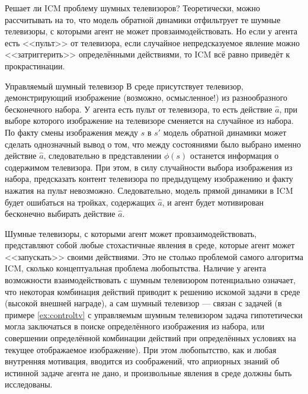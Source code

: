 Решает ли ICM проблему шумных телевизоров? Теоретически, можно рассчитывать на то, что модель обратной динамики отфильтрует те шумные телевизоры, с которыми агент не может провзаимодействовать. Но если у агента есть <<пульт>> от телевизора, если случайное непредсказуемое явление можно <<затриггерить>> определёнными действиями, то ICM всё равно приведёт к прокрастинации.

\begin{exampleBox}[label=ex:controltv]{Управляемый шумный телевизор}
В среде присутствует телевизор, демонстрирующий изображение (возможно, осмысленное!) из разнообразного бесконечного набора. У агента есть пульт от телевизора, то есть действие $\hat{a}$, при выборе которого изображение на телевизоре сменяется на случайное из набора. По факту смены изображения между $s$ в $s'$ модель обратной динамики может сделать однозначный вывод о том, что между состояниями было выбрано именно действие $\hat{a}$, следовательно в представлении $\phi(s)$ останется информация о содержимом телевизора. При этом, в силу случайности выбора изображения из набора, предсказать контент телевизора по предыдущему изображению и факту нажатия на пульт невозможно. Следовательно, модель прямой динамики в ICM будет ошибаться на тройках, содержащих $\hat{a}$, и агент будет мотивирован бесконечно выбирать действие $\hat{a}$.
\end{exampleBox}


Шумные телевизоры, с которыми агент может провзаимодействовать, представляют собой любые стохастичные явления в среде, которые агент может <<запускать>> своими действиями. Это не столько проблемой самого алгоритма ICM, сколько концептуальная проблема любопытства. Наличие у агента возможности взаимодействовать с шумным телевизором потенциально означает, что некоторая комбинация действий приводит к решению искомой задачи в среде (высокой внешней награде), а сам шумный телевизор --- связан с задачей (в примере \ref{ex:controltv} с управляемым шумным телевизором задача гипотетически могла заключаться в поиске определённого изображения из набора, или совершении определённой комбинации действий при определённых условиях на текущее отображаемое изображение). При этом любопытство, как и любая внутренняя мотивация, вводится из соображений, что априорных знаний об истинной задаче агента не дано, и произвольные явления в среде должны быть исследованы.

